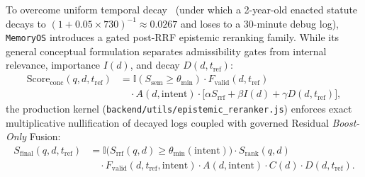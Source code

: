 \documentclass[10pt,twocolumn]{article}
\begin{document}
To overcome uniform temporal decay~\cite{E08} (under which a 2-year-old enacted statute decays to $(1 + 0.05 \times 730)^{-1} \approx 0.0267$ and loses to a 30-minute debug log), \texttt{MemoryOS} introduces a gated post-RRF epistemic reranking family. While its general conceptual formulation separates admissibility gates from internal relevance, importance $I(d)$, and decay $D(d, t_{\mathrm{ref}})$:
\begin{equation}
\begin{aligned}
\mathrm{Score}_{\mathrm{conc}}(q,d,t_{\mathrm{ref}}) &= \mathbb{I}(S_{\mathrm{sem}} \ge \theta_{\min}) \cdot F_{\mathrm{valid}}(d, t_{\mathrm{ref}}) \\
&\quad \cdot A(d, \mathrm{intent}) \cdot \bigl[\alpha S_{\mathrm{rrf}} + \beta I(d) + \gamma D(d, t_{\mathrm{ref}})\bigr],
\end{aligned}
\end{equation}
the production kernel (\texttt{backend/utils/epistemic\_reranker.js}) enforces exact multiplicative nullification of decayed logs coupled with governed Residual \emph{Boost-Only} Fusion:
\begin{equation}
\begin{aligned}
S_{\mathrm{final}}(q,d,t_{\mathrm{ref}}) &= \mathbb{I}\!\bigl(S_{\mathrm{rrf}}(q,d) \ge \theta_{\min}(\mathrm{intent})\bigr) \cdot S_{\mathrm{rank}}(q,d) \\
&\quad \cdot F_{\mathrm{valid}}(d, t_{\mathrm{ref}}, \mathrm{intent}) \cdot A(d, \mathrm{intent}) \cdot C(d) \cdot D(d, t_{\mathrm{ref}}).
\end{aligned}
\label{eq:sfinal}
\end{equation}
\end{document}
